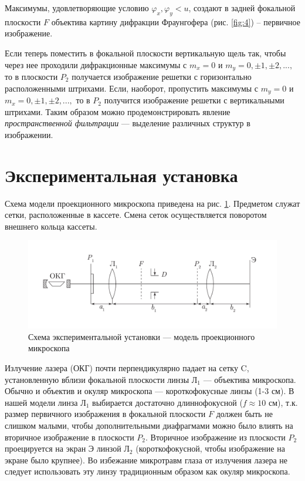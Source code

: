 \documentclass[a4paper, 12pt]{article}
\begin{document}
	Максимумы, удовлетворяющие условию $\varphi_x, \varphi_y<u$, создают в задней фокальной плоскости $F$ объектива картину дифракции Фраунгофера (рис. \ref{fig:4}) – первичное изображение.\par
	Если теперь поместить в фокальной плоскости вертикальную щель так, чтобы через нее проходили дифракционные максимумы с $m_x=0$ и $m_y=0,\pm1,\pm2,...,$ то в плоскости $P_2$ получается изображение решетки с горизонтально расположенными штрихами. Если, наоборот, пропустить максимумы с $m_y=0$ и $m_x=0,\pm1,\pm2,...,$ то в $P_2$ получится изображение решетки с вертикальными штрихами. Таким образом можно продемонстрировать явление \textit{пространственной фильтрации} — выделение различных структур в изображении.
	\section{Экспериментальная установка}
	Схема модели проекционного микроскопа приведена на рис. \ref{scheme}. Предметом служат сетки, расположенные в кассете. Смена сеток осуществляется поворотом внешнего кольца кассеты.\par
	\begin{figure}[h]
		\centering
		\includegraphics[scale=0.6]{scheme.pdf}
		\caption{Схема экспериментальной установки — модель проекционного микроскопа}
		\label{scheme}
	\end{figure}
	Излучение лазера (ОКГ) почти перпендикулярно падает на сетку $\text{C}$, установленную вблизи фокальной плоскости линзы $\text{Л}_1$ — объектива микроскопа. Обычно и объектив и окуляр микроскопа — короткофокусные линзы (1-3 см). В нашей модели линза $\text{Л}_1$ выбирается достаточно длиннофокусной ($f\approx 10$ см), т.к. размер первичного изображения в фокальной плоскости $F$ должен быть не слишком малыми, чтобы дополнительными диафрагмами можно было влиять на вторичное изображение в плоскости $P_2$. Вторичное изображение из плоскости $P_2$ проецируется на экран $\text{Э}$ линзой $\text{Л}_2$ (короткофокусной, чтобы изображение на экране было крупнее). Во избежание микротравм глаза от излучения лазера не следует использовать эту линзу традиционным образом как окуляр микроскопа.\par
\end{document}
